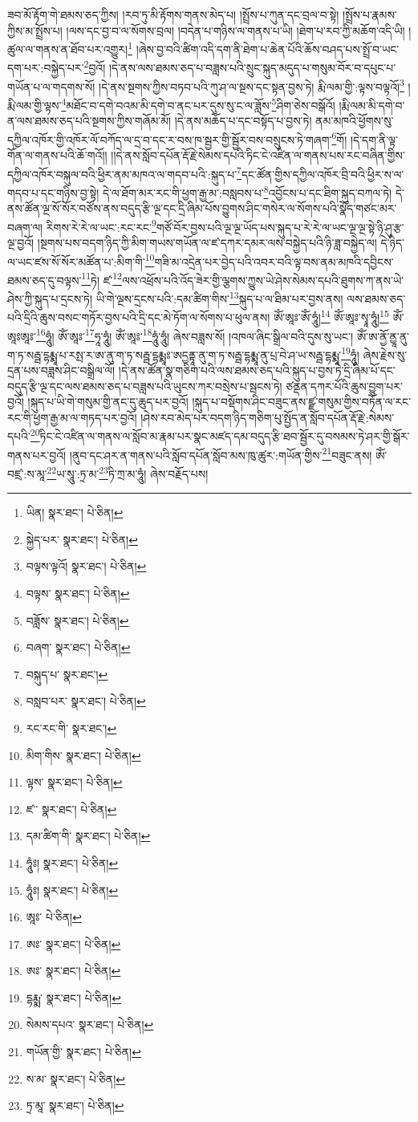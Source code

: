 ཟབ་མོ་རྟོག་གེ་ཐམས་ཅད་ཀྱིས། །རབ་ཏུ་མི་རྟོགས་གནས་མེད་པ། །སྤྲོས་པ་ཀུན་དང་བྲལ་བ་སྟེ། །སྤྲོས་པ་རྣམས་ཀྱིས་མ་སྤྲོས་པ། །ལས་དང་བྱ་བ་ལ་སོགས་བྲལ། །བདེན་པ་གཉིས་ལ་གནས་པ་ཡི། །ཐེག་པ་རབ་ཀྱི་མཆོག་འདི་ཡི། །ཚུལ་ལ་གནས་ན་ཐོབ་པར་འགྱུར།\footnote{ཡིན།  སྣར་ཐང་།  པེ་ཅིན། } །ཞེས་བྱ་བའི་ཚིག་འདི་དག་ནི་ཐེག་པ་ཆེན་པོའི་ཆོས་བཤད་པས་སྤྲོ་བ་ཡང་དག་པར་:བསྐྱེད་པར་\footnote{སྐྱེད་པར་  སྣར་ཐང་།  པེ་ཅིན། }བྱའོ། །དེ་ནས་ལས་ཐམས་ཅད་པ་བཟླས་པའི་སྲུང་སྐུད་མདུད་པ་གསུམ་བོར་བ་དཔུང་པ་གཡོན་པ་ལ་གདགས་སོ། །དེ་ནས་སྔགས་ཀྱིས་བཏབ་པའི་ཀུ་ཤ་ལ་སྔས་དང་སྟན་བྱས་ཏེ། རྨི་ལམ་གྱི་:ལྟས་བལྟའོ།\footnote{བལྟས་ལྟའོ།  སྣར་ཐང་།  པེ་ཅིན། } །རྨི་ལམ་གྱི་ལྟས་\footnote{བལྟས་  སྣར་ཐང་།  པེ་ཅིན། }མཐོང་བ་དགེ་བའམ་མི་དགེ་བ་ནང་པར་དུས་སུ་ང་ལ་ཟློས་\footnote{བཟློས་  སྣར་ཐང་།  པེ་ཅིན། }ཤིག་ཅེས་བསྒོའོ། །རྨི་ལམ་མི་དགེ་བ་ན་ལས་ཐམས་ཅད་པའི་སྔགས་ཀྱིས་གཞོམ་མོ། །དེ་ནས་མཆོད་པ་དང་བསྟོད་པ་བྱས་ཏེ། ནམ་མཁའི་ཕྱོགས་སུ་དཀྱིལ་འཁོར་གྱི་འཁོར་ལོ་བཀོད་ལ་དྲ་བ་དང་ར་བས་ཁ་སྦྱར་གྱི་སྦྱོར་བས་བསྲུངས་ཏེ་གཞག་\footnote{བཞག་  སྣར་ཐང་།  པེ་ཅིན། }གོ། །དེ་དག་ནི་ལྟ་གོན་ལ་གནས་པའི་ཆོ་གའོ།། །།དེ་ནས་སློབ་དཔོན་རྡོ་རྗེ་སེམས་དཔའི་ཏིང་ངེ་འཛིན་ལ་གནས་པས་རང་བཞིན་གྱིས་དཀྱིལ་འཁོར་བསྐུལ་བའི་ཕྱིར་ནམ་མཁའ་ལ་གདབ་པའི་:སྐུད་པ་\footnote{བསྐུད་པ་  སྣར་ཐང་། }དང་ཚོན་གྱིས་དཀྱིལ་འཁོར་བྲི་བའི་ཕྱིར་ས་ལ་གདབ་པ་དང་གཉིས་བྱ་སྟེ། དེ་ལ་ཐོག་མར་རང་གི་ཕྱག་རྒྱ་མ་:བསླབས་པ་\footnote{བསླབ་པར་  སྣར་ཐང་།  པེ་ཅིན། }འབྱོངས་པ་དང་ཐིག་སྐུད་བཀལ་ཏེ། དེ་ནས་ཚོན་ལྔ་སོ་སོར་བཙོས་ནས་བདུད་རྩི་ལྔ་དང་དྲི་ཞིམ་པོས་བྱུགས་ཤིང་གསེར་ལ་སོགས་པའི་སྣོད་གཙང་མར་བཞག་ལ། རིགས་རེ་རེ་ལ་ཡང་:རང་རང་\footnote{རང་རང་གི་  སྣར་ཐང་། }གཙོ་བོར་བྱས་པའི་ལྔ་ལྔ་ཡོད་པས་སྐུད་པ་རེ་རེ་ལ་ཡང་ལྔ་ལྔ་སྟེ་ཉི་ཤུ་རྩ་ལྔ་བྱའོ། །སྔགས་པས་བདག་ཉིད་ཀྱི་མིག་གཡས་གཡོན་ལ་ཛ་དཀར་དམར་ལས་བསྐྱེད་པའི་ཉི་ཟླ་བསྐྱེད་ལ། དེ་ཉིད་ལ་ཡང་ཛས་སོ་སོར་མཚོན་པ་:མིག་གི་\footnote{མིག་གིས་  སྣར་ཐང་།  པེ་ཅིན། }གཟི་མ་འདྲེན་པར་བྱེད་པའི་འབར་བའི་ལྟ་བས་ནམ་མཁའི་དབྱིངས་ཐམས་ཅད་དུ་བལྟས་\footnote{ལྟས་  སྣར་ཐང་།  པེ་ཅིན། }ཏེ། ཛ་\footnote{ཛ་་  སྣར་ཐང་།  པེ་ཅིན། }ལས་འཕྲོས་པའི་འོད་ཟེར་གྱི་ལྕགས་ཀྱུས་ཡེ་ཤེས་སེམས་དཔའི་ཐུགས་ཀ་ནས་ཡེ་ཤེས་ཀྱི་སྐུད་པ་དྲངས་ཏེ། ཡི་གེ་ལྔས་དྲངས་པའི་:དམ་ཚིག་གིས་\footnote{དམ་ཚིག་གི་  སྣར་ཐང་།  པེ་ཅིན། }སྐུད་པ་ལ་ཐིམ་པར་བྱས་ནས། ལས་ཐམས་ཅད་པའི་དྲིའི་ཆུས་བསང་གཏོར་བྱས་པའི་དྲི་དང་མེ་ཏོག་ལ་སོགས་པ་ཕུལ་ནས། ཨོཾ་ཨཱཿ་ཨོཾ་ཧཱུཾ།\footnote{ཧཱུཾཿ།  སྣར་ཐང་།  པེ་ཅིན། } ཨོཾ་ཨཱཿ་སྭཱ་ཧཱུཾ།\footnote{ཧཱུཾཿ།  སྣར་ཐང་།  པེ་ཅིན། } ཨོཾ་ཨཱཿཨཱཿ་\footnote{ཨཱཿ་  པེ་ཅིན། }ཧཱུཾ། ཨོཾ་ཨཱཿ་\footnote{ཨཿ་  སྣར་ཐང་།  པེ་ཅིན། }ཧཱ་ཧཱུཾ། ཨོཾ་ཨཱཿ་\footnote{ཨཿ་  སྣར་ཐང་།  པེ་ཅིན། }ཧཱུཾ་ཧཱུཾ། ཞེས་བཟླས་སོ། །འཁལ་ཞིང་སྒྲིལ་བའི་དུས་སུ་ཡང་། ཨོཾ་ཨ་ནྱོ་ནྱཱ་ནུ་ག་ཏ་སརྦྦ་དྷརྨྨཱ་པ་རསྤ་ར་ཨ་ནུ་ག་ཏ་སརྦྦ་དྷརྨྨཱཿ་ཨདྱནྟཱ་ནུ་ག་ཏ་སརྦྦ་དྷརྨྨཱ་ནུ་པྲ་བེ་ཤ་ཡ་སརྦྦ་དྷརྨྨཱ་\footnote{དྷརྨྨ་  སྣར་ཐང་།  པེ་ཅིན། }ཧཱུཾ། ཞེས་རྗེས་སུ་དྲན་པས་བཟླས་ཤིང་བསྒྲིལ་ལོ། །དེ་ནས་ཚོན་སྣ་གཅིག་པའི་ལས་ཐམས་ཅད་པའི་སྐུད་པ་བྱས་ཏེ་དྲི་ཞིམ་པོ་དང་བདུད་རྩི་ལྔ་དང་ལས་ཐམས་ཅད་པ་བཟླས་པའི་ཡུངས་ཀར་བསྲེས་པ་སྦངས་ཏེ། ཙནྡན་དཀར་པོའི་ཆུས་བྱུག་པར་བྱའོ། །སྐུད་པ་ཡི་གེ་གསུམ་གྱི་ནང་དུ་ཆུད་པར་བྱའོ། །སྐུད་པ་བསྡོགས་ཤིང་བཟུང་ནས་ཛྫ་གསུམ་གྱིས་བཏོན་ལ་རང་རང་གི་ཕྱག་རྒྱ་མ་ལ་གཏད་པར་བྱའོ། །ཤེས་རབ་མེད་པར་བདག་ཉིད་གཅིག་པུ་སྤྱོད་ན་སློབ་དཔོན་རྡོ་རྗེ་:སེམས་དཔའི་\footnote{སེམས་དཔའ་  སྣར་ཐང་།  པེ་ཅིན། }ཏིང་ངེ་འཛིན་ལ་གནས་ལ་སློབ་མ་རྣམ་པར་སྣང་མཛད་དམ་བདུད་རྩི་ཐབ་སྦྱོར་དུ་བསམས་ཏེ་ཤར་གྱི་སྒོར་གནས་པར་བྱའོ། །ནུབ་དང་ཤར་ན་གནས་པའི་སློབ་དཔོན་སློབ་མས་ཁུ་ཚུར་:གཡོན་གྱིས་\footnote{གཡོན་གྱི་  སྣར་ཐང་།  པེ་ཅིན། }བཟུང་ནས། ཨོཾ་བཛྲ་:ས་མཱ་\footnote{ས་མ་  སྣར་ཐང་།  པེ་ཅིན། }ཡ་སཱུ་:ཏྲ་མ་\footnote{ཏྲ་མཱ་  སྣར་ཐང་།  པེ་ཅིན། }ཏི་ཀྲ་མ་ཧཱུཾ། ཞེས་བརྗོད་པས། 